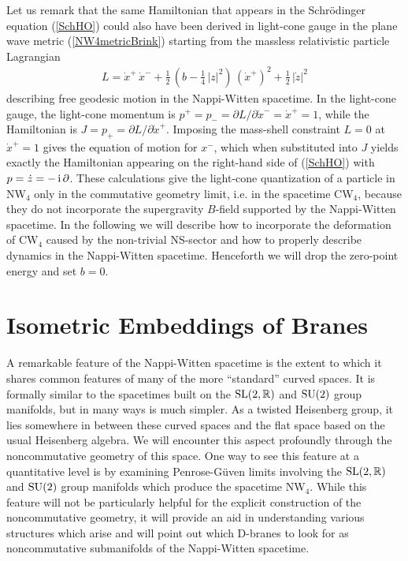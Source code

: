 \documentclass[11pt,a4paper]{article}
\newcommand{\ii}{{\rm i}}
\def\ii{{\,{\rm i}\,}}
\newcommand{\newsection}{\setcounter{equation}{0}\section}
\newcommand{\real}{{\mathbb R}} %
\newcommand{\beq}{\begin{eqnarray}}
\newcommand{\eeq}{\end{eqnarray}}
\begin{document}
Let us remark that the same Hamiltonian that appears in the
Schr\"odinger equation (\ref{SchHO}) could also have been derived in
light-cone gauge in the plane wave metric (\ref{NW4metricBrink})
starting from the massless relativistic particle Lagrangian
\beq
L=\dot x^+\,\dot x^-+\mbox{$\frac12$}\,\left(b-\mbox{$\frac14$}\,
|z|^2\right)\,\left(\dot x^+\right)^2+\mbox{$\frac12$}\,\left|\dot z
\right|^2
\label{masslessLag}\eeq
describing free geodesic motion in the Nappi-Witten spacetime. In the
light-cone gauge, the light-cone momentum is $p^+=p_-=\partial
L/\partial\dot x^-=\dot x^+=1$, while the Hamiltonian is
$J=p_+=\partial L/\partial\dot x^+$. Imposing the mass-shell
constraint $L=0$ at $\dot x^+=1$ gives the equation of motion for
$x^-$, which when substituted into $J$ yields exactly the Hamiltonian
appearing on the right-hand side of (\ref{SchHO}) with $p=\dot
z=-\ii\partial$. These calculations give the light-cone quantization
of a particle in NW$_4$ only in the commutative geometry limit,
i.e. in the spacetime CW$_4$,
because they do not incorporate the supergravity $B$-field supported
by the Nappi-Witten spacetime. In the following we will describe how to incorporate
the deformation of CW$_4$ caused by the non-trivial NS-sector and how to properly
describe dynamics in the Nappi-Witten spacetime. Henceforth we will
drop the zero-point energy and set $b=0$.

\newsection{Isometric Embeddings of Branes\label{IsomEmb}}

A remarkable feature of the Nappi-Witten spacetime is the extent to
which it shares common features of many of the more ``standard''
curved spaces. It is formally similar to the spacetimes built on the
${\rm SL}(2,\real)$ and ${\rm SU}(2)$ group manifolds, but in many ways is much
simpler. As a twisted Heisenberg group, it lies somewhere in between
these curved spaces and the flat space based on the usual Heisenberg
algebra. We will encounter this aspect profoundly through the
noncommutative geometry of this space. One way to see this feature at
a quantitative level is by examining Penrose-G\"uven limits involving the
${\rm SL}(2,\real)$ and ${\rm SU}(2)$ group manifolds which produce the
spacetime NW$_4$. While this feature will not be particularly helpful
for the explicit construction of the noncommutative geometry, it will
provide an aid in understanding various structures which arise and
will point out which D-branes to look for as noncommutative
submanifolds of the Nappi-Witten spacetime.
\end{document}
